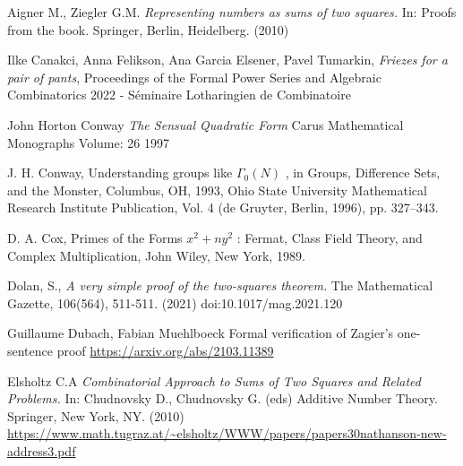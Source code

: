 \documentclass[12pt,a4paper]{amsart}
\begin{document}


Aigner M., Ziegler G.M.  
\textit{Representing numbers as sums of two squares.} In: Proofs from the book. Springer, Berlin, Heidelberg. (2010)



Ilke Canakci, Anna Felikson, Ana Garcia Elsener, Pavel Tumarkin,
\textit{Friezes for a pair of pants},
Proceedings of the Formal Power Series and Algebraic Combinatorics 2022 - Séminaire Lotharingien de Combinatoire

John Horton Conway
\textit{The Sensual Quadratic Form}
Carus Mathematical Monographs
Volume: 26
1997

J. H. Conway, Understanding groups like $\Gamma_0(N)$
, in Groups, Difference Sets, and the Monster, Columbus, OH, 1993, Ohio State University Mathematical Research Institute Publication, Vol. 4 (de Gruyter, Berlin, 1996), pp. 327–343.

 D. A. Cox, Primes of the Forms $x^2 + ny^2$
: Fermat, Class Field Theory, and
Complex Multiplication, John Wiley, New York, 1989.

Dolan, S., 
\textit{A very simple proof of the two-squares theorem.}
The Mathematical Gazette, 106(564), 511-511. (2021) doi:10.1017/mag.2021.120

Guillaume Dubach, Fabian Muehlboeck
Formal verification of Zagier's one-sentence proof
\url{https://arxiv.org/abs/2103.11389}

Elsholtz C.A 
\textit{Combinatorial Approach to Sums of Two Squares and Related Problems.}
 In: Chudnovsky D., Chudnovsky G. (eds) Additive Number Theory. Springer, New York, NY.
 (2010) 
 \url{https://www.math.tugraz.at/~elsholtz/WWW/papers/papers30nathanson-new-address3.pdf}
\end{document}
